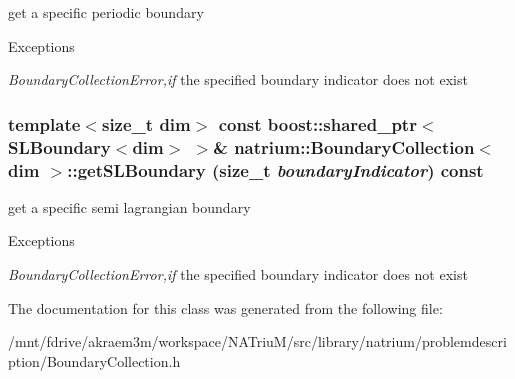 get a specific periodic boundary 
\begin{DoxyExceptions}{Exceptions}
\item[{\em BoundaryCollectionError,if}]the specified boundary indicator does not exist \end{DoxyExceptions}
\hypertarget{classnatrium_1_1BoundaryCollection_ab914df04ecc518f42f8a61287f2f8b3c}{
\subsubsection[{getSLBoundary}]{\setlength{\rightskip}{0pt plus 5cm}template$<$size\_\-t dim$>$ const boost::shared\_\-ptr$<${\bf SLBoundary}$<$dim$>$ $>$\& {\bf natrium::BoundaryCollection}$<$ dim $>$::getSLBoundary (size\_\-t {\em boundaryIndicator}) const}}
\label{classnatrium_1_1BoundaryCollection_ab914df04ecc518f42f8a61287f2f8b3c}


get a specific semi lagrangian boundary 
\begin{DoxyExceptions}{Exceptions}
\item[{\em BoundaryCollectionError,if}]the specified boundary indicator does not exist \end{DoxyExceptions}


The documentation for this class was generated from the following file:\begin{DoxyCompactItemize}
\item 
/mnt/fdrive/akraem3m/workspace/NATriuM/src/library/natrium/problemdescription/BoundaryCollection.h\end{DoxyCompactItemize}
